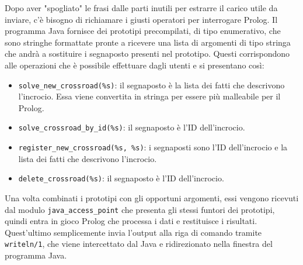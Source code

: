 Dopo aver "spogliato" le frasi dalle parti inutili per estrarre il carico utile da inviare, c'è bisogno di richiamare i giusti operatori per interrogare Prolog. Il programma Java fornisce dei prototipi precompilati, di tipo enumerativo, che sono stringhe formattate pronte a ricevere una lista di argomenti di tipo stringa che andrà a sostituire i segnaposto presenti nel prototipo. Questi corrispondono alle operazioni che è possibile effettuare dagli utenti e si presentano così:
\begin{itemize}
	\item \texttt{solve\_new\_crossroad(\%s)}: il segnaposto è la lista dei fatti che descrivono l'incrocio. Essa viene convertita in stringa per essere più malleabile per il Prolog.
	\item \texttt{solve\_crossroad\_by\_id(\%s)}: il segnaposto è l'ID dell'incrocio.
	\item \texttt{register\_new\_crossroad(\%s, \%s)}: i segnaposti sono l'ID dell'incrocio e la lista dei fatti che descrivono l'incrocio.
	\item \texttt{delete\_crossroad(\%s)}: il segnaposto è l'ID dell'incrocio.
\end{itemize}

Una volta combinati i prototipi con gli opportuni argomenti, essi vengono ricevuti dal modulo \texttt{java\_access\_point} che presenta gli stessi funtori dei prototipi, quindi entra in gioco Prolog che processa i dati e restituisce i risultati. Quest'ultimo semplicemente invia l'output alla riga di comando tramite \texttt{writeln/1}, che viene intercettato dal Java e ridirezionato nella finestra del programma Java.
